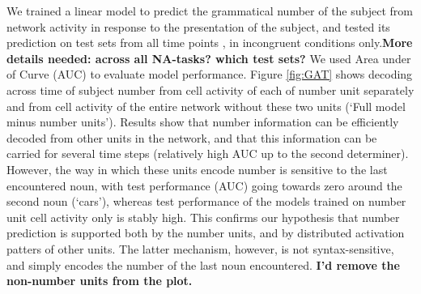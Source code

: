 We trained a linear model to predict the grammatical number of the subject from network activity in response to the presentation of the subject, and tested its prediction on test sets from all time points , in incongruent conditions only.\textbf{More details needed: across all NA-tasks? which test sets?} We used Area under of Curve (AUC) to evaluate model performance. Figure \ref{fig:GAT} shows decoding across time of subject number from cell activity of each of number unit separately and  from cell activity of the entire network without these two units (`Full model minus number units'). Results show that number information can be efficiently decoded from other units in the network, and that this information can be carried for several time steps (relatively high AUC up to the second determiner). However, the way in which these units encode number is sensitive to the last encountered noun, with test performance (AUC) going towards zero around the second noun (`cars'), whereas test performance of the models trained on number unit cell activity only is stably high. This confirms our hypothesis that number prediction is supported both by the number units, and by distributed activation patters of other units. The latter mechanism, however, is not syntax-sensitive, and simply encodes the number of the last noun encountered. \textbf{I'd remove the non-number units from the plot.}



